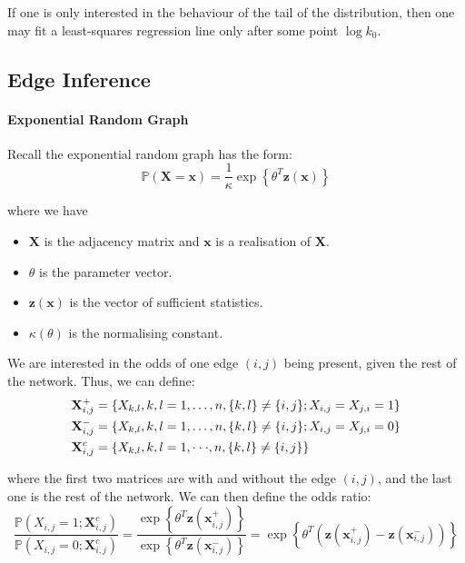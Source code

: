 \documentclass{article}
\begin{document}
\begin{remark}
    If one is only interested in the behaviour of the tail of the distribution, then one may fit a least-squares regression line only after some point $\log k_0$.
\end{remark}

\subsection{Edge Inference}
\paragraph{Exponential Random Graph}
Recall the exponential random graph has the form:
\begin{equation*}
    \mathbb{P}(\mathbf{X}=\mathbf{x})={\frac{1}{\kappa}}\exp\left\{\theta^{T}\mathbf{z}(\mathbf{x})\right\}
\end{equation*}

where we have 
\begin{itemize}
    \item $\mathbf{X}$ is the adjacency matrix and $\mathbf{x}$ is a realisation of $\mathbf{X}$.
    \item $\theta$ is the parameter vector.
    \item $\mathbf{z}(\mathbf{x})$ is the vector of sufficient statistics.
    \item $\kappa(\theta)$ is the normalising constant.
\end{itemize}
We are interested in the odds of one edge $(i,j)$ being present, given the rest of the network. Thus, we can define:
\begin{align*}
    {\bf X}_{i,j}^{+}&=\{X_{k,l},k,l=1,\dots,n,\{k,l\}\neq\{i,j\};X_{i,j}=X_{j,i}=1\}\\
    {\bf X}_{i,j}^{-}&=\{X_{k,l},k,l=1,\dots,n,\{k,l\}\ne\{i,j\};X_{i,j}=X_{j,i}=0\}\\
    \mathbf{X}_{i,j}^{c}&=\{X_{k,l},k,l=1,\cdot\cdot\cdot,n,\{k,l\}\neq\{i,j\}\}
\end{align*}

where the first two matrices are with and without the edge $(i,j)$, and the last one is the rest of the network. We can then define the odds ratio:  
\begin{equation*}
    \frac{\mathbb{P}(X_{i,j}=1;\mathbf{X}_{i,j}^{c})}{\mathbb{P}(X_{i,j}=0;\mathbf{X}_{i,j}^{c})}=\frac{\exp\left\{\theta^{T}\mathbf{z}(\mathbf{x}_{i,j}^{+})\right\}}{\exp\left\{\theta^{T}\mathbf{z}(\mathbf{x}_{i,j}^{-})\right\}}=\exp\left\{\theta^{T}\left(\mathbf{z}(\mathbf{x}_{i,j}^{+})-\mathbf{z}(\mathbf{x}_{i,j}^{-})\right)\right\}
\end{equation*}
\end{document}
